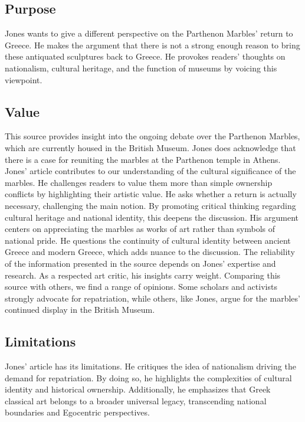 \documentclass[12pt, letterpaper]{article}
\begin{document}
\subsection*{Purpose}
 Jones wants to give a different perspective on the Parthenon Marbles' return to Greece. He makes the argument that there is not a strong enough reason to bring these antiquated sculptures back to Greece.  He provokes readers' thoughts on nationalism, cultural heritage, and the function of museums by voicing this viewpoint. 

\subsection*{Value}
This source provides insight into the ongoing debate over the Parthenon Marbles, which are currently housed in the British Museum. Jones does acknowledge that there is a case for reuniting the marbles at the Parthenon temple in Athens. Jones’ article contributes to our understanding of the cultural significance of the marbles. He challenges readers to value them more than simple ownership conflicts by highlighting their artistic value.
He asks whether a return is actually necessary, challenging the main notion. By promoting critical thinking regarding cultural heritage and national identity, this deepens the discussion. His argument centers on appreciating the marbles as works of art rather than symbols of national pride.
He questions the continuity of cultural identity between ancient Greece and modern Greece, which adds nuance to the discussion. The reliability of the information presented in the source depends on Jones’ expertise and research. As a respected art critic, his insights carry weight.
Comparing this source with others, we find a range of opinions. Some scholars and activists strongly advocate for repatriation, while others, like Jones, argue for the marbles’ continued display in the British Museum.

\subsection*{Limitations}
Jones’ article has its limitations. He critiques the idea of nationalism driving the demand for repatriation. By doing so, he highlights the complexities of cultural identity and historical ownership. Additionally, he emphasizes that Greek classical art belongs to a broader universal legacy, transcending national boundaries and Egocentric perspectives.
\end{document}
